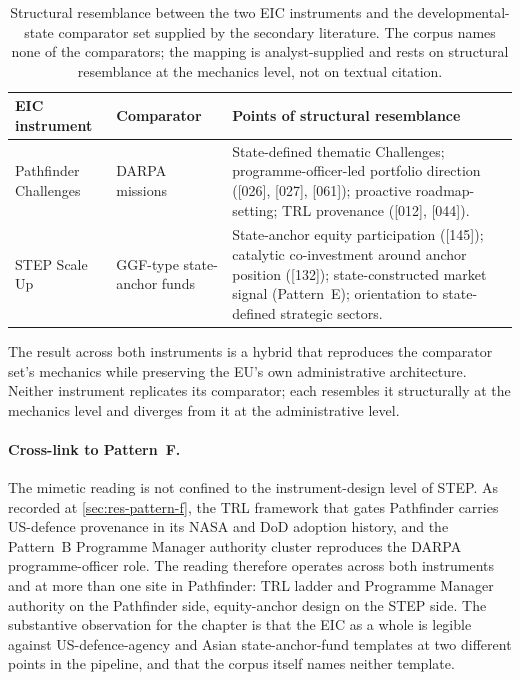 \begin{table}[H]
\centering
\caption[Symmetric mimetic mapping across the EIC]{Structural
resemblance between the two EIC instruments and the developmental-state
comparator set supplied by the secondary literature. The corpus names
none of the comparators; the mapping is analyst-supplied and rests on
structural resemblance at the mechanics level, not on textual citation.}
\label{tab:res-mimetic-mapping}
\begin{tabularx}{\textwidth}{@{}
  >{\raggedright\arraybackslash}p{}
  >{\raggedright\arraybackslash}p{}
  X @{}}
\toprule
\textbf{EIC instrument} & \textbf{Comparator} & \textbf{Points of
structural resemblance} \\
\midrule
Pathfinder Challenges
  & DARPA missions
  & State-defined thematic Challenges; programme-officer-led portfolio
    direction ([026], [027], [061]); proactive roadmap-setting; TRL
    provenance ([012], [044]). \\
STEP Scale Up
  & GGF-type state-anchor funds
  & State-anchor equity participation ([145]); catalytic co-investment
    around anchor position ([132]); state-constructed market signal
    (Pattern~E); orientation to state-defined strategic sectors. \\
\bottomrule
\end{tabularx}
\end{table}

The result across both instruments is a hybrid that reproduces the
comparator set's mechanics while preserving the EU's own administrative
architecture. Neither instrument replicates its comparator; each
resembles it structurally at the mechanics level and diverges from it
at the administrative level.

\paragraph{Cross-link to Pattern~F.}
The mimetic reading is not confined to the instrument-design level of
STEP. As recorded at \cref{sec:res-pattern-f}, the TRL framework that
gates Pathfinder carries US-defence provenance in its NASA and DoD
adoption history, and the Pattern~B Programme Manager authority
cluster reproduces the DARPA programme-officer role. The reading
therefore operates across both instruments and at more than one site
in Pathfinder: TRL ladder and Programme Manager authority on the
Pathfinder side, equity-anchor design on the STEP side. The
substantive observation for the chapter is that the EIC as a whole is
legible against US-defence-agency and Asian state-anchor-fund
templates at two different points in the pipeline, and that the corpus
itself names neither template.

